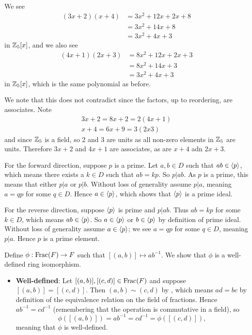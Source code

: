 \begin{questions}
    \item We see
    \begin{align*}
        (3x+2)(x+4) &= 3x^2 + 12x + 2x + 8\\
        &= 3x^2 + 14x + 8\\
        &= 3x^2 + 4x + 3
    \end{align*}
    in $\mathbb{Z}_5[x]$, and we also see
    \begin{align*}
        (4x+1)(2x+3) &= 8x^2 + 12x + 2x + 3\\
        &= 8x^2 + 14x + 3\\
        &= 3x^2 + 4x + 3
    \end{align*}
    in $\mathbb{Z}_5[x]$, which is the same polynomial as before.

    We note that this does not contradict  since the factors, up to reordering, are associates. Note
    \begin{align*}
        3x+2 = 8x+2 = 2(4x+1)\\
        x+4 = 6x+9 = 3(2x3)
    \end{align*}
    and since $\mathbb{Z}_5$ is a field, so 2 and 3 are units as all non-zero elements in $\mathbb{Z}_5$ are units. Therefore $3x+2$ and $4x+1$ are associates, as are $x+4$ adn $2x+3$.

    \item For the forward direction, suppose $p$ is a prime. Let $a, b \in D$ such that $ab \in \left\langle p\right\rangle$, which means there exists a $k \in D$ such that $ab = kp$. So $p \vert ab$. As $p$ is a prime, this means that either $p \vert a$ or $p \vert b$. Without loss of generality assume $p \vert a$, meaning $a = qp$ for some $q \in D$. Hence $a \in \left\langle p\right\rangle$, which shows that $\left\langle p\right\rangle$ is a prime ideal.
    
    For the reverse direction, suppose $\left\langle p\right\rangle$ is prime and $p \vert ab$. Thus $ab = kp$ for some $k \in D$, which means $ab \in \left\langle p\right\rangle$. So $a \in \left\langle p\right\rangle$ or $b \in \left\langle p\right\rangle$ by definition of prime ideal. Without loss of generality assume $a \in \left\langle p\right\rangle$; we see $a = qp$ for some $q \in D$, meaning $p \vert a$. Hence $p$ is a prime element.

    \item Define $\phi: \mathrm{Frac}(F) \to F$ such that $[(a,b)]\mapsto ab^{-1}$. We show that $\phi$ is a well-defined ring isomorphism.
    \begin{itemize}
        \item \textbf{Well-defined}: Let $[(a,b)], [(c,d)] \in \mathrm{Frac}(F)$ and suppose $[(a,b)] = [(c,d)]$. Then $(a,b) \mathrel{\sim} (c,d)$ by , which means $ad = bc$ by definition of the equivalence relation on the field of fractions. Hence $ab^{-1} = cd^{-1}$ (remembering that the operation is commutative in a field), so
        \[
            \phi([(a,b)]) = ab^{-1} = cd^{-1} = \phi([(c,d)]),
        \]
        meaning that $\phi$ is well-defined.
        

\end{itemize}
\end{questions}
